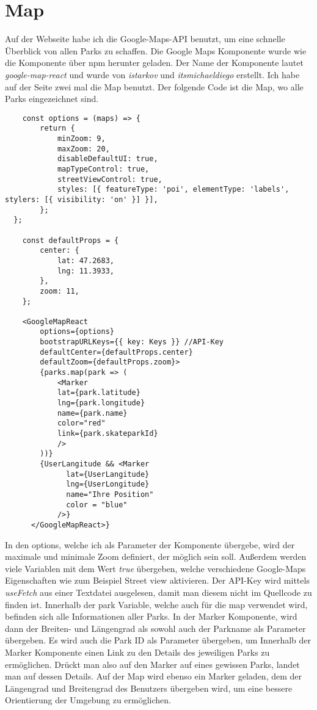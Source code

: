 \section{Map}
\label{map}

Auf der Webseite habe ich die Google-Maps-API benutzt, um eine schnelle Überblick von allen Parks
zu schaffen. Die Google Maps Komponente wurde wie die  Komponente über npm 
herunter geladen. Der Name der Komponente lautet \textit{google-map-react} und wurde von \textit{istarkov}
und \textit{itsmichaeldiego} erstellt. Ich habe auf der Seite zwei mal die Map benutzt. Der folgende 
Code ist die Map, wo alle Parks eingezeichnet sind.

\begin{lstlisting}
    const options = (maps) => {
        return {
            minZoom: 9,
            maxZoom: 20,
            disableDefaultUI: true,
            mapTypeControl: true,
            streetViewControl: true,
            styles: [{ featureType: 'poi', elementType: 'labels', stylers: [{ visibility: 'on' }] }],
        };
  };

    const defaultProps = {
        center: {
            lat: 47.2683,
            lng: 11.3933,
        },
        zoom: 11,
    };
    
    <GoogleMapReact
        options={options}
        bootstrapURLKeys={{ key: Keys }} //API-Key
        defaultCenter={defaultProps.center}
        defaultZoom={defaultProps.zoom}>
        {parks.map(park => (
            <Marker
            lat={park.latitude}
            lng={park.longitude}
            name={park.name}
            color="red"
            link={park.skateparkId}
            />  
        ))}
        {UserLangitude && <Marker
              lat={UserLangitude}
              lng={UserLongitude}
              name="Ihre Position"
              color = "blue"
            />}
      </GoogleMapReact>}
\end{lstlisting}

In den options, welche ich als Parameter der Komponente übergebe, wird der maximale und minimale Zoom 
definiert, der möglich sein soll. Außerdem werden viele Variablen mit dem Wert \textit{true} übergeben, 
welche verschiedene Google-Maps Eigenschaften wie zum Beispiel Street view aktivieren. Der API-Key 
wird mittels \textit{useFetch} aus einer Textdatei ausgelesen, damit man diesem nicht im Quellcode zu 
finden ist. Innerhalb der park Variable, welche auch für die map verwendet wird, befinden sich alle 
Informationen aller Parks. In der Marker Komponente, wird dann der Breiten- und Längengrad als sowohl auch
der Parkname als Parameter übergeben. Es wird auch die Park ID als Parameter übergeben, um Innerhalb der 
Marker Komponente einen Link zu den Details des jeweiligen Parks zu ermöglichen. Drückt man also auf den Marker 
auf eines gewissen Parks, landet man auf dessen Details. Auf der Map wird ebenso ein Marker geladen, dem 
der Längengrad und Breitengrad des Benutzers übergeben wird, um eine bessere Orientierung der Umgebung 
zu ermöglichen.

